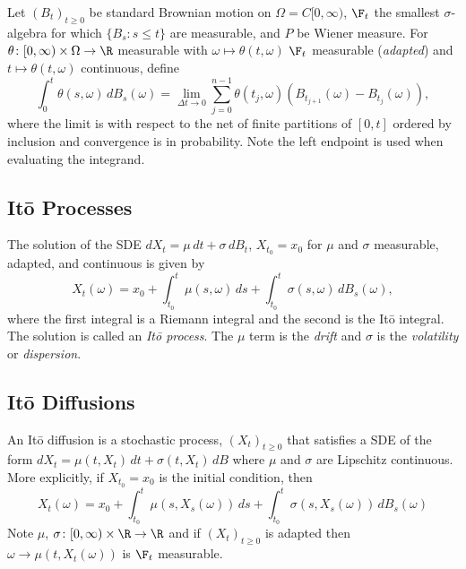 Let $(B_t)_{t\ge0}$ be standard Brownian motion on $\Omega = C[0,\infty)$,
$\F_t$ the smallest $\sigma$-algebra for which $\{B_s:s\le t\}$ are
measurable, and $P$ be Wiener measure.  For $\theta\colon [0,\infty)\times
\Omega\to\R$ measurable with $\omega\mapsto\theta(t,\omega)$ $\F_t$
measurable ({\em adapted}) and $t\mapsto\theta(t, \omega)$ continuous, define
\begin{equation*}
\int_0^t \theta(s,\omega)\,dB_s(\omega)
	= \lim_{\Delta t\to 0} \sum_{j = 0}^{n - 1} \theta(t_j, \omega)
	(B_{t_{j+1}}(\omega) - B_{t_j}(\omega)),
\end{equation*}
where the limit is with respect
to the net of finite partitions of $[0,t]$ ordered by inclusion
and convergence is in probability. Note the left endpoint is used
when evaluating the integrand.



\subsection{It\=o Processes}
The solution of the SDE $dX_t = \mu\,dt + \sigma\,dB_t$, $X_{t_0} = x_0$
for $\mu$ and $\sigma$ measurable, adapted, and continuous is given by
\begin{equation*}
X_t(\omega) = x_0 + \int_{t_0}^t \mu(s, \omega)\,ds
	+ \int_{t_0}^t \sigma(s, \omega)\,dB_s(\omega),
\end{equation*}
where the first integral is a Riemann integral and the second is
the It\=o integral. The solution is called an {\em It\=o process}.
The $\mu$ term is the {\em drift} and $\sigma$ is the
{\em volatility} or {\em dispersion}.

\subsection{It\=o Diffusions}
An It\=o diffusion is a stochastic process, $(X_t)_{t\ge0}$ that
satisfies a SDE of the form $dX_t = \mu(t, X_t)\,dt + \sigma(t, X_t)\,dB$
where $\mu$ and $\sigma$ are Lipschitz continuous.
More explicitly, if $X_{t_0} = x_0$ is the initial condition, then
\begin{equation*}
X_t(\omega) = x_0 + \int_{t_0}^t \mu(s, X_s(\omega))\,ds
	+ \int_{t_0}^t \sigma(s, X_s(\omega))\,dB_s(\omega)
\end{equation*}
Note $\mu$, $\sigma\colon [0,\infty)\times\R\to\R$ and if
$(X_t)_{t\ge0}$ is adapted then $\omega\to\mu(t, X_t(\omega))$
is $\F_t$ measurable.

